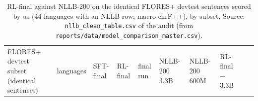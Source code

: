 \begin{table}[t]
\centering
\scriptsize
\setlength{\tabcolsep}{3pt}
\caption{RL-final against NLLB-200 on the identical FLORES+ devtest sentences scored by us (44 languages with an NLLB row; macro chrF++), by subset. Source: \texttt{nllb\_clean\_table.csv} of the audit (from \texttt{reports/data/model\_comparison\_master.csv}).}
\label{tab:t_exposure_nllb}
{\def\LTcaptype{none} %
\begin{tabular}{@{}
  >{\raggedright\arraybackslash}p{}
  >{\raggedleft\arraybackslash}p{}
  >{\raggedleft\arraybackslash}p{}
  >{\raggedleft\arraybackslash}p{}
  >{\raggedleft\arraybackslash}p{}
  >{\raggedleft\arraybackslash}p{}
  >{\raggedleft\arraybackslash}p{}
  >{\raggedleft\arraybackslash}p{}
  >{\raggedleft\arraybackslash}p{}
  >{\raggedleft\arraybackslash}p{}@{}}
\toprule
\begin{minipage}[b]{\linewidth}\raggedright
FLORES+ devtest subset (identical sentences)
\end{minipage} & \begin{minipage}[b]{\linewidth}\raggedleft
languages
\end{minipage} & \begin{minipage}[b]{\linewidth}\raggedleft
SFT-final
\end{minipage} & \begin{minipage}[b]{\linewidth}\raggedleft
RL-final
\end{minipage} & \begin{minipage}[b]{\linewidth}\raggedleft
final run
\end{minipage} & \begin{minipage}[b]{\linewidth}\raggedleft
NLLB-200 3.3B
\end{minipage} & \begin{minipage}[b]{\linewidth}\raggedleft
NLLB-200 600M
\end{minipage} & \begin{minipage}[b]{\linewidth}\raggedleft
RL-final \(-\) 3.3B
\end{minipage} & \begin{minipage}[b]{\linewidth}\raggedleft

\end{minipage}
\end{tabular}}
\end{table}
